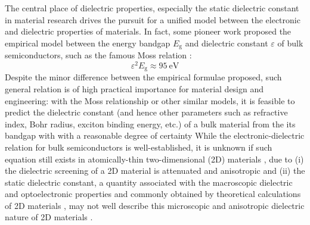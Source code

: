 \documentclass[journal=ancac3,manuscript=article,email=true,hyperref=true,keywords=false]{achemso}
\begin{document}
The central place of dielectric properties, especially the static
dielectric constant in material research
\cite{Dressel_2001_electrodynamics} drives the pursuit for a unified
model between the electronic and dielectric properties of materials.
In fact, some pioneer
work\cite{Moss_1950_relation,Moss_1985_n_Eg,Ravindra_1979_eps_Eg,Ravindra_2007_Eg_rev}
proposed the empirical model between the energy bandgap
$E_{\mathrm{g}}$ and dielectric constant $\varepsilon$ of bulk
semiconductors, such as the famous Moss relation
\cite{Moss_1950_relation,Moss_1985_n_Eg}:
\begin{equation}
\label{eq:Moss-relations}
\varepsilon^{2} E_{\mathrm{g}} \approx 95\ \mathrm{eV}
\end{equation}
Despite the minor difference between the empirical formulae proposed,
such general relation  is of high
practical importance for material design and engineering: with the
Moss relationship or other similar models, it is feasible to predict
the dielectric constant (and hence other parameters such as refractive
index, Bohr radius, exciton binding energy, etc.) of a bulk material
from the its bandgap with with a reasonable degree of certainty
While the electronic-dielectric relation for bulk semiconductors is
well-established, it is unknown if such equation still exists in
atomically-thin two-dimensional (2D) materials \cite{Novoselov_2016},
due to (i) the dielectric screening of a 2D material is attenuated and
anisotropic
\cite{Keldysh_1979_eps_multi,Sharma_1985,Low_2014_screening_BP,Cudazzo_2011_screening_2D,Bechstedt_2012}
and (ii) the static dielectric constant, a quantity associated with
the macroscopic dielectric and optoelectronic properties and commonly
obtained by theoretical calculations of 2D materials
\cite{Ramasubramaniam_2012,Wang_2016_Aip,Laturia_2018}, may not well
describe this microscopic and anisotropic dielectric nature of 2D
materials \cite{Cudazzo_2010_screen2D,Cudazzo_2011_screening_2D}.
\end{document}
